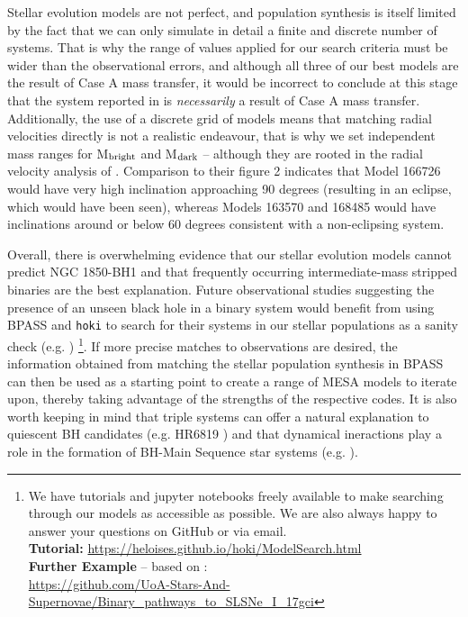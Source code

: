\documentclass[fleqn,usenatbib]{mnras}
\begin{document}
Stellar evolution models are not perfect, and population synthesis is itself limited by the fact that we can only simulate in detail a finite and discrete number of systems.
That is why the range of values applied for our search criteria must be wider than the observational errors, and although all three of our best models are the result of Case A mass transfer, it would be incorrect to conclude at this stage that the system reported in \cite{saracino2021} is \textit{necessarily} a result of Case A mass transfer. 
Additionally, the use of a discrete grid of models means that matching radial velocities directly is not a realistic endeavour, that is why we set independent mass ranges for M$_{\rm bright}$ and M$_{\rm dark}$ -- although they are rooted in the radial velocity analysis of \citealt{el-badry2021}. 
Comparison to their figure 2 indicates that Model 166726 would have very high inclination approaching 90 degrees (resulting in an eclipse, which would have been seen), whereas Models  163570 and 168485 would have inclinations around or below 60 degrees consistent with a non-eclipsing system.

Overall, there is overwhelming evidence that our stellar evolution models cannot predict NGC 1850-BH1 and that frequently occurring intermediate-mass stripped binaries are the best explanation. 
Future observational studies suggesting the presence of an unseen black hole in a binary system would benefit from using BPASS and {\tt hoki} to search for their systems in our stellar populations as a sanity check (e.g. \citealt{2020MNRAS.495.2786E}) \footnote{We have tutorials and jupyter notebooks freely available to make searching through our models as accessible as possible. We are also always happy to answer your questions on GitHub or via email.\\ \textbf{Tutorial:} \url{https://heloises.github.io/hoki/ModelSearch.html}  \\ \textbf{Further Example} -- based on \citep{stevance2021}:\\ \url{https://github.com/UoA-Stars-And-Supernovae/Binary_pathways_to_SLSNe_I_17gci}}.
If more precise matches to observations are desired, the information obtained from matching the stellar population synthesis in BPASS can then be used as a starting point to create a range of MESA models to iterate upon, thereby taking advantage of the strengths of the respective codes. 
It is also worth keeping in mind that triple systems can offer a natural explanation to quiescent BH candidates (e.g. HR6819 \citealt{romagnolo2021}) and that dynamical ineractions play a role in the formation of BH-Main Sequence star systems (e.g. \citealt{banerjee2018}).
\end{document}
